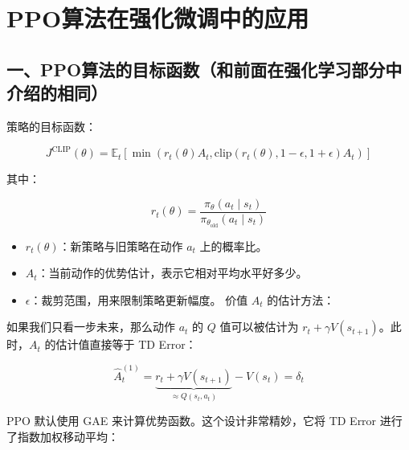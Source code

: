 \setcounter{section}{5}

\hypertarget{ppoux7b97ux6cd5ux5728ux5f3aux5316ux5faeux8c03ux4e2dux7684ux5e94ux7528}{%
\section{PPO算法在强化微调中的应用}\label{ppoux7b97ux6cd5ux5728ux5f3aux5316ux5faeux8c03ux4e2dux7684ux5e94ux7528}}

\hypertarget{ux4e00ppoux7b97ux6cd5ux7684ux76eeux6807ux51fdux6570ux548cux524dux9762ux5728ux5f3aux5316ux5b66ux4e60ux90e8ux5206ux4e2dux4ecbux7ecdux7684ux76f8ux540c}{%
\subsection{一、PPO算法的目标函数（和前面在强化学习部分中介绍的相同）}\label{ux4e00ppoux7b97ux6cd5ux7684ux76eeux6807ux51fdux6570ux548cux524dux9762ux5728ux5f3aux5316ux5b66ux4e60ux90e8ux5206ux4e2dux4ecbux7ecdux7684ux76f8ux540c}}

策略的目标函数：

\[
J^{\mathrm{CLIP}}(\theta)
=
\mathbb{E}_t\left[
\min\left(
r_t(\theta)A_t,
\mathrm{clip}(r_t(\theta), 1-\epsilon, 1+\epsilon)A_t
\right)
\right]
\]

其中：

\[
r_t(\theta)=\frac{\pi_\theta(a_t \mid s_t)}{\pi_{\theta_{\mathrm{old}}}(a_t \mid s_t)}
\]

\begin{itemize}
\tightlist
\item
  \(r_t(\theta)\)：新策略与旧策略在动作 \(a_t\) 上的概率比。
\item
  \(A_t\)：当前动作的优势估计，表示它相对平均水平好多少。
\item
  \(\epsilon\)：裁剪范围，用来限制策略更新幅度。
  价值 \(A_t\) 的估计方法：
\end{itemize}

如果我们只看一步未来，那么动作 \(a_t\) 的 \(Q\) 值可以被估计为 \(r_t + \gamma V(s_{t+1})\)。此时，\(A_t\) 的估计值直接等于 TD Error：

\[
\hat{A}_t^{(1)}
=
\underbrace{r_t + \gamma V(s_{t+1})}_{\approx Q(s_t,a_t)}
- V(s_t)
=
\delta_t
\]

PPO 默认使用 GAE 来计算优势函数。这个设计非常精妙，它将 TD Error 进行了指数加权移动平均：

